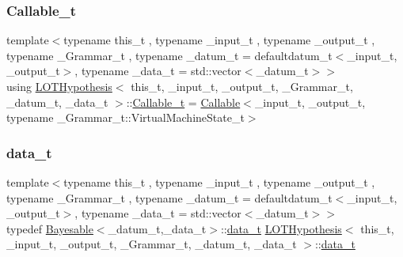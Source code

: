 \subsubsection{\texorpdfstring{Callable\+\_\+t}{Callable\_t}}
{\footnotesize\ttfamily template$<$typename this\+\_\+t , typename \+\_\+input\+\_\+t , typename \+\_\+output\+\_\+t , typename \+\_\+\+Grammar\+\_\+t , typename \+\_\+datum\+\_\+t  = defaultdatum\+\_\+t$<$\+\_\+input\+\_\+t, \+\_\+output\+\_\+t$>$, typename \+\_\+data\+\_\+t  = std\+::vector$<$\+\_\+datum\+\_\+t$>$$>$ \\
using \hyperlink{class_l_o_t_hypothesis}{L\+O\+T\+Hypothesis}$<$ this\+\_\+t, \+\_\+input\+\_\+t, \+\_\+output\+\_\+t, \+\_\+\+Grammar\+\_\+t, \+\_\+datum\+\_\+t, \+\_\+data\+\_\+t $>$\+::\hyperlink{class_l_o_t_hypothesis_ab635fd5106a80f66c2ce04123b969611}{Callable\+\_\+t} =  \hyperlink{class_callable}{Callable}$<$\+\_\+input\+\_\+t, \+\_\+output\+\_\+t, typename \+\_\+\+Grammar\+\_\+t\+::\+Virtual\+Machine\+State\+\_\+t$>$}

\mbox{\label{class_l_o_t_hypothesis_ad1394085e1aea271eb0f5536350b1068}} 
\subsubsection{\texorpdfstring{data\+\_\+t}{data\_t}}
{\footnotesize\ttfamily template$<$typename this\+\_\+t , typename \+\_\+input\+\_\+t , typename \+\_\+output\+\_\+t , typename \+\_\+\+Grammar\+\_\+t , typename \+\_\+datum\+\_\+t  = defaultdatum\+\_\+t$<$\+\_\+input\+\_\+t, \+\_\+output\+\_\+t$>$, typename \+\_\+data\+\_\+t  = std\+::vector$<$\+\_\+datum\+\_\+t$>$$>$ \\
typedef \hyperlink{class_bayesable}{Bayesable}$<$\+\_\+datum\+\_\+t,\+\_\+data\+\_\+t$>$\+::\hyperlink{class_l_o_t_hypothesis_ad1394085e1aea271eb0f5536350b1068}{data\+\_\+t} \hyperlink{class_l_o_t_hypothesis}{L\+O\+T\+Hypothesis}$<$ this\+\_\+t, \+\_\+input\+\_\+t, \+\_\+output\+\_\+t, \+\_\+\+Grammar\+\_\+t, \+\_\+datum\+\_\+t, \+\_\+data\+\_\+t $>$\+::\hyperlink{class_l_o_t_hypothesis_ad1394085e1aea271eb0f5536350b1068}{data\+\_\+t}}

\mbox{\label{class_l_o_t_hypothesis_a3da7a75d135620a3d48a3bfe0be11401}} 
